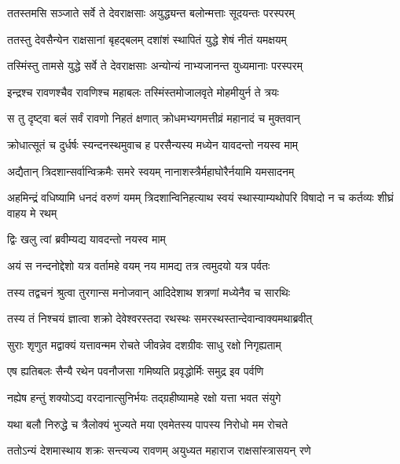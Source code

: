 
\twolineshloka
{ततस्तमसि सञ्जाते सर्वे ते देवराक्षसाः}
{अयुद्ध्यन्त बलोन्मत्ताः सूदयन्तः परस्परम्} %

\twolineshloka
{ततस्तु देवसैन्येन राक्षसानां बृहद्बलम्}
{दशांशं स्थापितं युद्धे शेषं नीतं यमक्षयम्} %

\twolineshloka
{तस्मिंस्तु तामसे युद्धे सर्वे ते देवराक्षसाः}
{अन्योन्यं नाभ्यजानन्त युध्यमानाः परस्परम्} %

\twolineshloka
{इन्द्रश्च रावणश्चैव रावणिश्च महाबलः}
{तस्मिंस्तमोजालवृते मोहमीयुर्न ते त्रयः} %

\twolineshloka
{स तु दृष्ट्वा बलं सर्वं रावणो निहतं क्षणात्}
{क्रोधमभ्यगमत्तीव्रं महानादं च मुक्तवान्} %

\twolineshloka
{क्रोधात्सूतं च दुर्धर्षः स्यन्दनस्थमुवाच ह}
{परसैन्यस्य मध्येन यावदन्तो नयस्व माम्} %

\twolineshloka
{अद्यैतान् त्रिदशान्सर्वान्विक्रमैः समरे स्वयम्}
{नानाशस्त्रैर्महाघोरैर्नयामि यमसादनम्} %

\threelineshloka
{अहमिन्द्रं वधिष्यामि धनदं वरुणं यमम्}
{त्रिदशान्विनिहत्याथ स्वयं स्थास्याम्यथोपरि}
{विषादो न च कर्तव्यः शीघ्रं वाहय मे रथम्} %

\onelineshloka
{द्विः खलु त्वां ब्रवीम्यद्य यावदन्तो नयस्व माम्} %

\twolineshloka
{अयं स नन्दनोद्देशो यत्र वर्तामहे वयम्}
{नय मामद्य तत्र त्वमुदयो यत्र पर्वतः} %

\twolineshloka
{तस्य तद्वचनं श्रुत्वा तुरगान्स मनोजवान्}
{आदिदेशाथ शत्रणां मध्येनैव च सारथिः} %

\twolineshloka
{तस्य तं निश्चयं ज्ञात्वा शक्रो देवेश्वरस्तदा}
{रथस्थः समरस्थस्तान्देवान्वाक्यमथाब्रवीत्} %

\twolineshloka
{सुराः शृणुत मद्वाक्यं यत्तावन्मम रोचते}
{जीवन्नेव दशग्रीवः साधु रक्षो निगृह्यताम्} %

\twolineshloka
{एष ह्यतिबलः सैन्यै रथेन पवनौजसा}
{गमिष्यति प्रवृद्धोर्मिः समुद्र इव पर्वणि} %

\twolineshloka
{नह्येष हन्तुं शक्योऽद्य वरदानात्सुनिर्भयः}
{तद्ग्रहीष्यामहे रक्षो यत्ता भवत संयुगे} %

\twolineshloka
{यथा बलौ निरुद्धे च त्रैलोक्यं भुज्यते मया}
{एवमेतस्य पापस्य निरोधो मम रोचते} %

\twolineshloka
{ततोऽन्यं देशमास्थाय शक्रः सन्त्यज्य रावणम्}
{अयुध्यत महाराज राक्षसांस्त्रासयन् रणे} %

